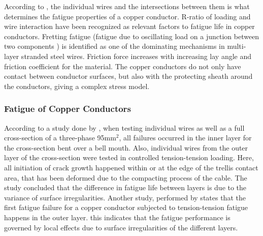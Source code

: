 \noindent According to \cite{Karlsen2010}, the individual wires and the intersections between them is what determines the fatigue properties of a copper conductor. R-ratio of loading and wire interaction have been recognized as relevant factors to fatigue life in copper conductors. Fretting fatigue (fatigue due to oscillating load on a junction between two components \cite{Hills1994}) is identified as one of the dominating mechanisms in multi-layer stranded steel wires. Friction force increases with increasing lay angle and friction coefficient for the material. The copper conductors do not only have contact between conductor surfaces, but also with the protecting sheath around the conductors, giving a complex stress model.

\subsubsection{Fatigue of Copper Conductors}
\label{sec:fatcop}
According to a study done by \cite{Nasution2013}, when testing individual wires as well as a full cross-section of a three-phase 95mm$^2$, all failures occurred in the inner layer for the cross-section bent over a bell mouth. Also, individual wires from the outer layer of the cross-section were tested in controlled tension-tension loading. Here, all initiation of crack growth happened within or at the edge of the trellis contact area, that has been deformed due to the compacting process of the cable. The study concluded that the difference in fatigue life between layers is due to the variance of surface irregularities. Another study, performed by \cite{NASUTION2014} states that the first fatigue failure for a copper conductor subjected to tension-tension fatigue happens in the outer layer. this indicates that the fatigue performance is governed by local effects due to surface irregularities of the different layers. \newline
\newline
